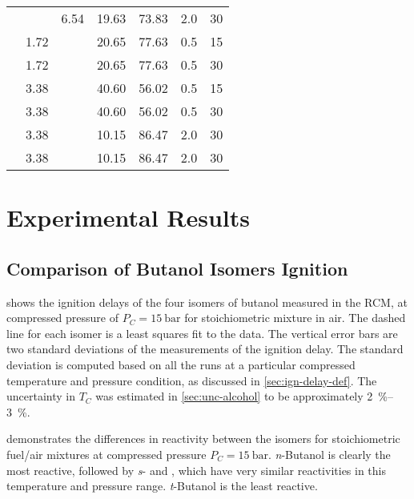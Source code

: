 \documentclass[../main.tex]{subfiles}
\begin{document}
\begin{table}
\begin{tabular}{*{7}{S}}
         &      & 6.54 & 19.63 & 73.83 & 2.0 & 30 \\
         & 1.72 &      & 20.65 & 77.63 & 0.5 & 15 \\
         & 1.72 &      & 20.65 & 77.63 & 0.5 & 30 \\
         & 3.38 &      & 40.60 & 56.02 & 0.5 & 15 \\
         & 3.38 &      & 40.60 & 56.02 & 0.5 & 30 \\
         & 3.38 &      & 10.15 & 86.47 & 2.0 & 30 \\
         & 3.38 &      & 10.15 & 86.47 & 2.0 & 30 \\
    \bottomrule
    \end{tabular}
\end{table}

\section{Experimental Results}
\subsection{Comparison of Butanol Isomers Ignition}
\label{sec:buoh-expts}

 shows the ignition delays of the four isomers of
butanol measured in the RCM, at compressed pressure of $P_C=\SI{15}{\bar}$ for
stoichiometric mixture in air. The dashed line for each isomer is a least
squares fit to the data. The vertical error bars are two standard deviations
of the measurements of the ignition delay. The standard deviation is computed
based on all the runs at a particular compressed temperature and pressure
condition, as discussed in \cref{sec:ign-delay-def}. The uncertainty in
$T_C$ was estimated in \cref{sec:unc-alcohol} to be approximately
\SIrange{2}{3}{\percent}.

 demonstrates the differences in reactivity between
the isomers for stoichiometric fuel/air mixtures at compressed pressure
$P_C=\SI{15}{\bar}$. \textit{n}-Butanol is clearly the most reactive, followed by
\textit{s}- and \iBuOH{}, which have very similar reactivities in
this temperature and pressure range. \textit{t}-Butanol is the least reactive.
\end{document}
